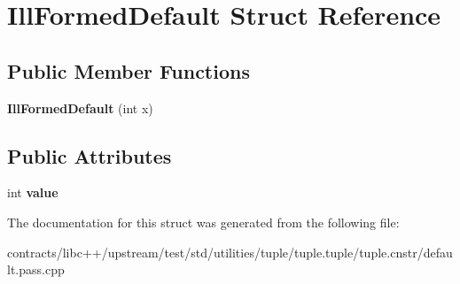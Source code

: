 \hypertarget{struct_ill_formed_default}{}\section{Ill\+Formed\+Default Struct Reference}
\label{struct_ill_formed_default}
\subsection*{Public Member Functions}
\begin{DoxyCompactItemize}
\item 
\mbox{\label{struct_ill_formed_default_ae886bb70bccf552ec726fbafb29c76b7}} 
{\bfseries Ill\+Formed\+Default} (int x)
\end{DoxyCompactItemize}
\subsection*{Public Attributes}
\begin{DoxyCompactItemize}
\item 
\mbox{\label{struct_ill_formed_default_a5cfaaa127d50dc41e20c1b41a65cc2cf}} 
int {\bfseries value}
\end{DoxyCompactItemize}


The documentation for this struct was generated from the following file\+:\begin{DoxyCompactItemize}
\item 
contracts/libc++/upstream/test/std/utilities/tuple/tuple.\+tuple/tuple.\+cnstr/default.\+pass.\+cpp\end{DoxyCompactItemize}
